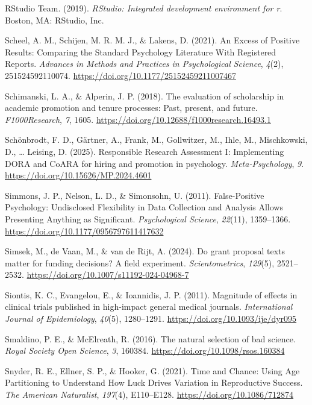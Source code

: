 \documentclass[
  british,
  a4paper,
  ,man,floatsintext]{apa6}
\newlength{\cslhangindent}
\newenvironment{CSLReferences}[2] %
 {\begin{list}{}{%
  \setlength{\itemindent}{0pt}
  \setlength{\leftmargin}{0pt}
  \setlength{\parsep}{0pt}
  \ifodd #1
   \setlength{\leftmargin}{\cslhangindent}
   \setlength{\itemindent}{-1\cslhangindent}
  \fi
  \setlength{\itemsep}{#2\baselineskip}}}
 {\end{list}}
\begin{document}
\begin{CSLReferences}{1}{0}
RStudio Team. (2019). \emph{{RStudio}: {Integrated} development environment for r}. Boston, MA: RStudio, Inc.

Scheel, A. M., Schijen, M. R. M. J., \& Lakens, D. (2021). An {Excess} of {Positive Results}: {Comparing} the {Standard Psychology Literature With Registered Reports}. \emph{Advances in Methods and Practices in Psychological Science}, \emph{4}(2), 251524592110074. \url{https://doi.org/10.1177/25152459211007467}

Schimanski, L. A., \& Alperin, J. P. (2018). The evaluation of scholarship in academic promotion and tenure processes: {Past}, present, and future. \emph{F1000Research}, \emph{7}, 1605. \url{https://doi.org/10.12688/f1000research.16493.1}

Schönbrodt, F. D., Gärtner, A., Frank, M., Gollwitzer, M., Ihle, M., Mischkowski, D., \ldots{} Leising, D. (2025). Responsible {Research Assessment I}: {Implementing DORA} and {CoARA} for hiring and promotion in psychology. \emph{Meta-Psychology}, \emph{9}. \url{https://doi.org/10.15626/MP.2024.4601}

Simmons, J. P., Nelson, L. D., \& Simonsohn, U. (2011). False-{Positive Psychology}: {Undisclosed Flexibility} in {Data Collection} and {Analysis Allows Presenting Anything} as {Significant}. \emph{Psychological Science}, \emph{22}(11), 1359--1366. \url{https://doi.org/10.1177/0956797611417632}

Simsek, M., de Vaan, M., \& van de Rijt, A. (2024). Do grant proposal texts matter for funding decisions? {A} field experiment. \emph{Scientometrics}, \emph{129}(5), 2521--2532. \url{https://doi.org/10.1007/s11192-024-04968-7}

Siontis, K. C., Evangelou, E., \& Ioannidis, J. P. (2011). Magnitude of effects in clinical trials published in high-impact general medical journals. \emph{International Journal of Epidemiology}, \emph{40}(5), 1280--1291. \url{https://doi.org/10.1093/ije/dyr095}

Smaldino, P. E., \& McElreath, R. (2016). The natural selection of bad science. \emph{Royal Society Open Science}, \emph{3}, 160384. \url{https://doi.org/10.1098/rsos.160384}

Snyder, R. E., Ellner, S. P., \& Hooker, G. (2021). Time and {Chance}: {Using Age Partitioning} to {Understand How Luck Drives Variation} in {Reproductive Success}. \emph{The American Naturalist}, \emph{197}(4), E110--E128. \url{https://doi.org/10.1086/712874}


\end{CSLReferences}
\end{document}
